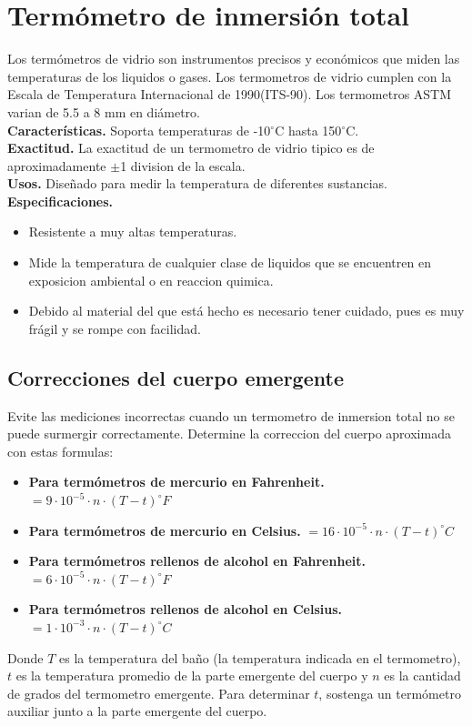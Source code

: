 \documentclass[a4paper,11pt]{report}
\begin{document}
\section{Termómetro de inmersión total}
Los termómetros de vidrio son instrumentos precisos y económicos que miden las temperaturas de los liquidos o gases. Los termometros de vidrio cumplen con la Escala de Temperatura Internacional de 1990(ITS-90). Los termometros ASTM varian de 5.5 a 8 mm en diámetro.\\
\textbf{Características.} Soporta temperaturas de -10$^{\circ}$C hasta 150$^{\circ}$C.\\
\textbf{Exactitud.} La exactitud de un termometro de vidrio tipico es de aproximadamente $\pm$1 division de la escala.\\
\textbf{Usos.} Diseñado para medir la temperatura de diferentes sustancias.\\
\textbf{Especificaciones.}
\begin{itemize}
\item Resistente a muy altas temperaturas.
\item Mide la temperatura de cualquier clase de liquidos que se encuentren en exposicion ambiental o en reaccion quimica.
\item Debido al material del que está hecho es necesario tener cuidado, pues es muy frágil y se rompe con facilidad.
\end{itemize}
\subsection{Correcciones del cuerpo emergente}
Evite las mediciones incorrectas cuando un termometro de inmersion total no se puede surmergir correctamente. Determine la correccion del cuerpo aproximada con estas formulas:
\begin{itemize}
\item \textbf{Para termómetros de mercurio en Fahrenheit.} $ = 9\cdot 10^{-5} \cdot n \cdot (T-t) ^{\circ} F$
\item \textbf{Para termómetros de mercurio en Celsius.} $ = 16\cdot 10^{-5} \cdot n \cdot (T-t) ^{\circ} C$
\item \textbf{Para termómetros rellenos de alcohol en Fahrenheit.} $ = 6\cdot 10^{-5} \cdot n \cdot (T-t) ^{\circ} F$
\item \textbf{Para termómetros rellenos de alcohol en Celsius.} $ = 1\cdot 10^{-3} \cdot n \cdot (T-t) ^{\circ} C$
\end{itemize}
Donde $T$ es la temperatura del baño (la temperatura indicada en el termometro), $t$ es la temperatura promedio de la parte emergente del cuerpo y $n$ es la cantidad de grados del termometro emergente. Para determinar $t$, sostenga un termómetro auxiliar junto a la parte emergente del cuerpo.
\end{document}
